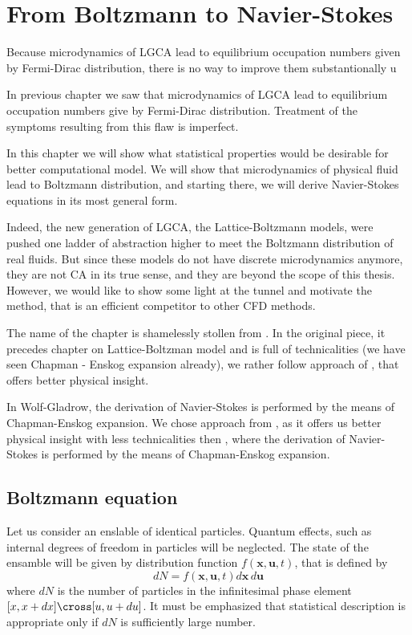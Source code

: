 \chapter{From Boltzmann to Navier-Stokes}

Because microdynamics of LGCA lead to equilibrium occupation numbers given by Fermi-Dirac distribution, there is no way to improve them substantionally u

In previous chapter we saw that microdynamics of LGCA lead to equilibrium occupation numbers give by Fermi-Dirac distribution.
Treatment of the symptoms resulting from this flaw is imperfect.

In this chapter we will show what statistical properties would be desirable for better computational model.
We will show that microdynamics of physical fluid lead to Boltzmann distribution, and starting there, we will derive Navier-Stokes equations in its most general form.
 
Indeed, the new generation of LGCA, the Lattice-Boltzmann models, were pushed one ladder of abstraction higher to meet the Boltzmann distribution of real fluids.
But since these models do not have discrete microdynamics anymore, they are not CA in its true sense, and they are beyond the scope of this thesis.
However, we would like to show some light at the tunnel and motivate the method, that is an efficient competitor to other CFD methods.

\bigskip
The name of the chapter is shamelessly stollen from \cite{wolf}. In the original piece, it precedes chapter on Lattice-Boltzman model and is full of technicalities (we have seen Chapman - Enskog expansion already), we rather follow approach of \cite{astro}, that offers better physical insight.

In Wolf-Gladrow, the derivation of Navier-Stokes is performed by the means of Chapman-Enskog expansion.
We chose approach from \cite{astro}, as it offers us better physical insight with less technicalities then \cite{wolf}, where the derivation of Navier-Stokes is performed by the means of Chapman-Enskog expansion.

\section{Boltzmann equation}

Let us consider an enslable of identical particles. Quantum effects, such as internal degrees of freedom in particles will be neglected. The state of the ensamble will be given by distribution function $f(\bm{x}, \bm{u}, t)$, that is defined by
\begin{equation} \label{hust}
dN = f(\bm{x}, \bm{u}, t) d\bm{x} \, d\bm{u}
\end{equation} 
where $dN$ is the number of particles in the infinitesimal phase element $[x, x+ dx] \cross [u, u +du]$.
It must be emphasized that statistical description is appropriate only if $dN$ is sufficiently large number.

